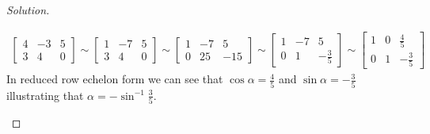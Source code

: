 \documentclass[ 12pt ]{article}
\begin{document}
\begin{enumerate}
\begin{proof}[Solution]
\begin{enumerate}
\begin{align*}
					\begin{bmatrix} 4 & -3 & 5 \\ 3 & 4 & 0 \end{bmatrix}
					\sim \begin{bmatrix} 1 & -7 & 5 \\ 3 & 4 & 0 \end{bmatrix}
					\sim \begin{bmatrix} 1 & -7 & 5 \\ 0 & 25 & -15 \end{bmatrix}
					\sim \begin{bmatrix} 1 & -7 & 5 \\ 0 & 1 & -\frac{3}{5} \end{bmatrix}
					\sim \begin{bmatrix} 1 & 0 & \frac{4}{5} \\ 0 & 1 & -\frac{3}{5} \end{bmatrix}
				\end{align*}
				In reduced row echelon form we can see that $\cos \alpha = \frac{4}{5}$ and $\sin \alpha = -\frac{3}{5}$ illustrating that $\alpha = -\sin^{-1}\frac{3}{5}$.
		\end{enumerate}
	\end{proof}
\end{enumerate}
\end{document}
